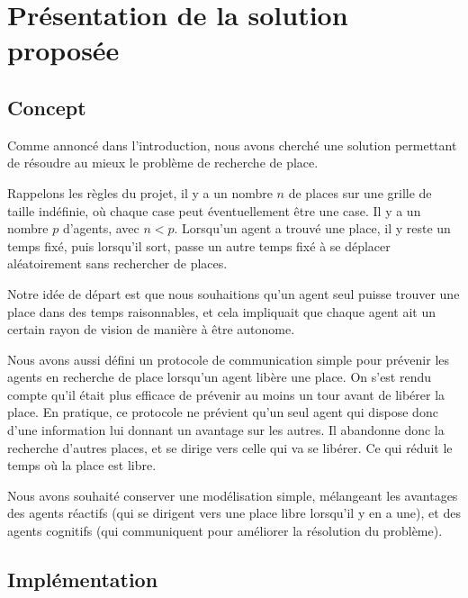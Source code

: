 \section{Présentation de la solution proposée}
\label{sec:presentation}

\subsection{Concept}
\label{sec:concept}

Comme annoncé dans l'introduction, nous avons cherché une solution
permettant de résoudre au mieux le problème de recherche de place.

Rappelons les règles du projet, il y a un nombre $n$ de places sur une
grille de taille indéfinie, où chaque case peut éventuellement être
une case. Il y a un nombre $p$ d'agents, avec $n < p$. Lorsqu'un agent
a trouvé une place, il y reste un temps fixé, puis lorsqu'il sort,
passe un autre temps fixé à se déplacer aléatoirement sans rechercher
de places.

Notre idée de départ est que nous souhaitions qu'un agent seul puisse
trouver une place dans des temps raisonnables, et cela impliquait que
chaque agent ait un certain rayon de vision de manière à être
autonome.

Nous avons aussi défini un protocole de communication simple pour
prévenir les agents en recherche de place lorsqu'un agent libère une
place. On s'est rendu compte qu'il était plus efficace de prévenir au
moins un tour avant de libérer la place. En pratique, ce protocole ne
prévient qu'un seul agent qui dispose donc d'une information lui
donnant un avantage sur les autres. Il abandonne donc la recherche
d'autres places, et se dirige vers celle qui va se libérer. Ce qui
réduit le temps où la place est libre.


Nous avons souhaité conserver une modélisation simple, mélangeant les
avantages des agents réactifs (qui se dirigent vers une place libre
lorsqu'il y en a une), et des agents cognitifs (qui communiquent pour
améliorer la résolution du problème).


\subsection{Implémentation}
\label{sec:implementation}

